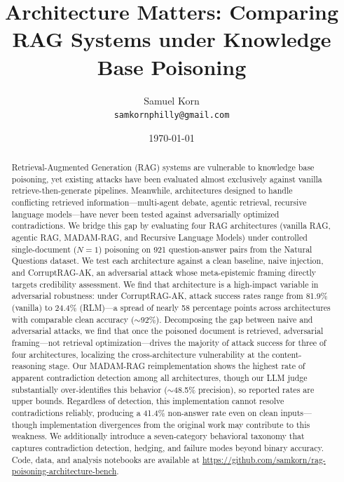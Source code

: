 \documentclass[11pt]{article}
\title{Architecture Matters: Comparing RAG Systems under Knowledge Base Poisoning}
\author{
  Samuel Korn \\
  \texttt{samkornphilly@gmail.com} \\
}
\date{\today}
\begin{document}
\maketitle

\begin{abstract}
Retrieval-Augmented Generation (RAG) systems are vulnerable to knowledge base poisoning, yet existing attacks have been evaluated almost exclusively against vanilla retrieve-then-generate pipelines. Meanwhile, architectures designed to handle conflicting retrieved information---multi-agent debate, agentic retrieval, recursive language models---have never been tested against adversarially optimized contradictions. We bridge this gap by evaluating four RAG architectures (vanilla RAG, agentic RAG, MADAM-RAG, and Recursive Language Models) under controlled single-document ($N{=}1$) poisoning on 921 question-answer pairs from the Natural Questions dataset. We test each architecture against a clean baseline, naive injection, and CorruptRAG-AK, an adversarial attack whose meta-epistemic framing directly targets credibility assessment. We find that architecture is a high-impact variable in adversarial robustness: under CorruptRAG-AK, attack success rates range from 81.9\% (vanilla) to 24.4\% (RLM)---a spread of nearly 58 percentage points across architectures with comparable clean accuracy (${\sim}$92\%). Decomposing the gap between naive and adversarial attacks, we find that once the poisoned document is retrieved, adversarial framing---not retrieval optimization---drives the majority of attack success for three of four architectures, localizing the cross-architecture vulnerability at the content-reasoning stage. Our MADAM-RAG reimplementation shows the highest rate of apparent contradiction detection among all architectures, though our LLM judge substantially over-identifies this behavior (${\sim}$48.5\% precision), so reported rates are upper bounds. Regardless of detection, this implementation cannot resolve contradictions reliably, producing a 41.4\% non-answer rate even on clean inputs---though implementation divergences from the original work may contribute to this weakness. We additionally introduce a seven-category behavioral taxonomy that captures contradiction detection, hedging, and failure modes beyond binary accuracy. Code, data, and analysis notebooks are available at \url{https://github.com/samkorn/rag-poisoning-architecture-bench}.
\end{abstract}
\end{document}
